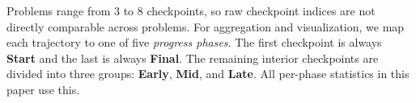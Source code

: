 Problems range from 3 to 8 checkpoints, so raw checkpoint indices are not directly comparable across problems. For aggregation and visualization, we map each trajectory to one of five \emph{progress phases}. The first checkpoint is always \textbf{Start} and the last is always \textbf{Final}. The remaining interior checkpoints are divided into three groups: \textbf{Early}, \textbf{Mid}, and \textbf{Late}. All per-phase statistics in this paper use this.





